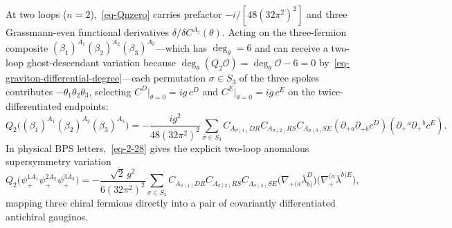 \documentclass[11pt]{article}
\numberwithin{equation}{section}
\numberwithin{figure}{section}
\numberwithin{table}{section}
\begin{document}
At two loops ($n=2$),~\eqref{eq-Qnzero} carries prefactor $-i/[48(32\pi^2)^2]$ and three Grassmann-even functional derivatives $\delta/\delta C^{A_j}(\theta)$. Acting on the three-fermion composite $(\beta_1)^{A_1}(\beta_2)^{A_2}(\beta_3)^{A_3}$---which has $\deg_\theta=6$ and can receive a two-loop ghost-descendant variation because $\deg_\theta(Q_2\mathcal O)=\deg_\theta\mathcal O-6=0$ by~\eqref{eq-graviton-differential-degree}---each permutation $\sigma\in S_3$ of the three spokes contributes $-\theta_1\theta_2\theta_3$, selecting $C^D|_{\theta=0}=ig\,c^D$ and $C^E|_{\theta=0}=ig\,c^E$ on the twice-differentiated endpoints:
\begin{equation}\label{eq-2-28}
Q_2\big((\beta_1)^{A_1}(\beta_2)^{A_2}(\beta_3)^{A_3}\big)=-\frac{ig^2}{48(32\pi^2)^2}\sum_{\sigma\in S_3}C_{A_{\sigma(1)}DR}C_{A_{\sigma(2)}RS}C_{A_{\sigma(3)}SE}(\partial_{+\dot a}\partial_{+\dot b}c^D)(\partial_+{}^{\dot a}\partial_+{}^{\dot b}c^E).
\end{equation}
In physical BPS letters,~\eqref{eq-2-28} gives the explicit two-loop anomalous supersymmetry variation
\begin{equation*}
Q_2\bigl(\psi_+^{1A_1}\psi_+^{2A_2}\psi_+^{3A_3}\bigr)
=-\frac{\sqrt2\,g^2}{6(32\pi^2)^2}\sum_{\sigma\in S_3}
C_{A_{\sigma(1)}DR}C_{A_{\sigma(2)}RS}C_{A_{\sigma(3)}SE}
\bigl(\nabla_{+(\dot a}\bar\lambda_{\dot b)}^D\bigr)
\bigl(\nabla_+^{(\dot a}\bar\lambda^{\dot b)E}\bigr),
\end{equation*}
mapping three chiral fermions directly into a pair of covariantly differentiated antichiral gauginos.
\end{document}
